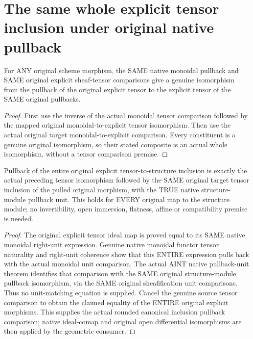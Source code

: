 \section{The same whole explicit tensor inclusion under original native pullback}
\label{sec:scheme-tensor-ideal-pullback}

\begin{definition}
\label{sc0-scheme-tensor-ideal-pullback:actual-iso}
\leanok
For ANY original scheme morphism, the SAME native monoidal pullback and
SAME original explicit sheaf-tensor comparisons give a genuine isomorphism
from the pullback of the original explicit tensor to the explicit tensor
of the SAME original pullbacks.
\end{definition}
\begin{proof}
First use the inverse of the actual monoidal tensor comparison followed
by the mapped original monoidal-to-explicit tensor isomorphism. Then use
the actual original target monoidal-to-explicit comparison. Every constituent
is a genuine original isomorphism, so their stated composite is an actual
whole isomorphism, without a tensor comparison premise.
\end{proof}

\begin{theorem}
\label{sc0-scheme-tensor-ideal-pullback:whole-inclusion}
\leanok
Pullback of the entire original explicit tensor-to-structure inclusion is
exactly the actual preceding tensor isomorphism followed by the SAME
original target tensor inclusion of the pulled original morphism, with
the TRUE native structure-module pullback unit. This holds for EVERY
original map to the structure module; no invertibility, open immersion,
flatness, affine or compatibility premise is needed.
\end{theorem}
\begin{proof}
The original explicit tensor ideal map is proved equal to its SAME native
monoidal right-unit expression. Genuine native monoidal functor tensor
naturality and right-unit coherence show that this ENTIRE expression pulls
back with the actual monoidal unit comparison. The actual AINT native
pullback-unit theorem identifies that comparison with the SAME original
structure-module pullback isomorphism, via the SAME original sheafification
unit comparisons. Thus no unit-matching equation is supplied. Cancel the
genuine source tensor comparison to obtain the claimed equality of the
ENTIRE original explicit morphisms. This supplies the actual rounded
canonical inclusion pullback comparison; native ideal-comap and original
open differential isomorphisms are then applied by the geometric consumer.
\end{proof}

